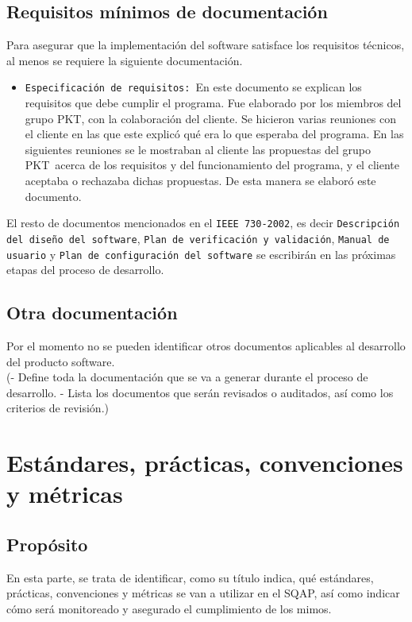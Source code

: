 \documentclass[spanish,a4paper,11pt, twoside]{report}	%
\newcommand*{\PKT}{\hbox{P}\kern-2.5pt\lower3.5pt\hbox{\small{K}}\kern-2.8pt\hbox{T}\kern-2pt}	%
\begin{document}
	\section{Requisitos mínimos de documentación}
		Para asegurar que la implementación del software satisface los requisitos técnicos, al menos se requiere la siguiente documentación.
		\begin{itemize}
		  \item \texttt{Especificación de requisitos: }En este documento se explican los requisitos que debe cumplir el programa. 
		  			Fue elaborado por los miembros del grupo \PKT , con la colaboración del cliente. Se hicieron varias reuniones con el cliente 
		  			en las que este explicó qué era lo que esperaba del programa. En las siguientes reuniones se le mostraban al cliente las propuestas del 
		  			grupo \PKT\ acerca de los requisitos y del funcionamiento del programa, y el cliente aceptaba o rechazaba dichas propuestas. 
		  			De esta manera se elaboró este documento.
		\end{itemize}
		El resto de documentos mencionados en el \texttt{IEEE 730-2002}, es decir \texttt{Descripción del diseño del software}, \texttt{Plan de verificación y validación}, 
		\texttt{Manual de usuario} y  \texttt{Plan de configuración del software} se escribirán en las próximas etapas del proceso de desarrollo. 
	\section{Otra documentación}
		Por el momento no se pueden identificar otros documentos aplicables al desarrollo del producto software.\\
	(- Define toda la documentación que se va a generar
	durante el proceso de desarrollo.
	- Lista los documentos que serán revisados o
	auditados, así como los criterios de revisión.)

\newpage
\mbox{}
\thispagestyle{empty}						%
\newpage

\chapter{ Estándares, prácticas, convenciones y métricas}

	\section{Propósito}
	En esta parte, se trata de identificar, como su título indica, qué estándares, prácticas, convenciones y métricas se van a utilizar en el SQAP, así como indicar cómo será monitoreado y asegurado el cumplimiento de los mimos.
	
\end{document}
